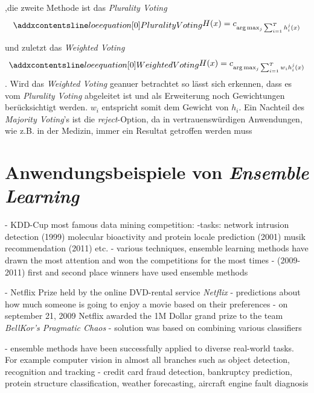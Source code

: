,die zweite Methode ist das \textit{Plurality Voting}
\begin{equation}
    \setequationentry{Plurality Voting}{}
    \begin{gathered}
        H(x) = c_{\arg \max_{j}\sum_{i=1}^{T}h_{i}^{j}(x)}
    \end{gathered}
    \label{eq:pluralityVoting}
\end{equation}

und zuletzt das \textit{Weighted Voting}
\begin{equation}
    \setequationentry{Weighted Voting}{}
    \begin{gathered}
        H(x) = c_{\arg \max_{j}\sum_{i=1}^{T}w_{i}h_{i}^{j}(x)}
    \end{gathered}
    \label{eq:weightedVoting}
\end{equation}
. Wird das \textit{Weighted Voting} geanuer betrachtet so lässt sich erkennen, dass es vom \textit{Plurality Voting} abgeleitet ist und als Erweiterung noch Gewichtungen berücksichtigt werden. $w_i$ entspricht somit dem Gewicht von $h_i$. Ein Nachteil des \textit{Majority Voting}'s ist die \textit{reject}-Option, da in vertrauenswürdigen Anwendungen, wie z.B. in der Medizin, immer ein Resultat getroffen werden muss \autocite[vgl. S.195]{Zhou.2021}

\section{Anwendungsbeispiele von \textit{Ensemble Learning}}
- KDD-Cup most famous data mining competition:
-tasks:
    network intrusion detection (1999)
    molecular bioactivity and protein locale prediction (2001)
    musik recommendation (2011)
    etc.
- various techniques, ensemble learning methods have drawn the most attention and won the competitions for the most times 
- (2009-2011) first and second place winners have used ensemble methods

- Netflix Prize held by the online DVD-rental service \textit{Netflix}
- predictions about how much someone is going to enjoy a movie based on their preferences
- on september 21, 2009 Netflix awarded the 1M Dollar grand prize to the team \textit{BellKor's Pragmatic Chaos}
- solution was based on combining various classifiers 

- ensemble methods have been successfully applied to diverse real-world tasks. For example computer vision in almost all branches such as object detection, recognition and tracking
- credit card fraud detection, bankruptcy prediction, protein structure classification, weather forecasting, aircraft engine fault diagnosis